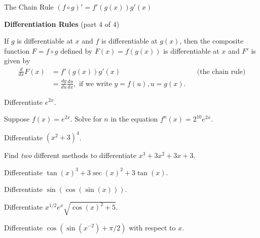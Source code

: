 \documentclass[../main.tex]{subfiles}
\begin{document}
\begin{lesson}{The Chain Rule \((f \circ g)' = f'(g(x))g'(x)\)}
  \begin{mdframed}[style=simple]
    \textbf{Differentiation Rules} \hfill {\footnotesize (part \(4\) of \(4\))}

    If \(g\) is differentiable at \(x\) and \(f\) is differentiable at \(g(x)\), then the composite function \(F = f \circ g\) defined by \(F(x) = f(g(x))\) is differentiable at \(x\) and \(F'\) is given by 
    \begin{align*}
      \frac{d}{dx} F(x) 
    &= f'(g(x)) g'(x)
    &&\text{(the chain rule)}\\[1em]
    &= \frac{dy}{du} \frac{du}{dx}, \text{ if we write } y = f(u), u = g(x).
    \end{align*}
  \end{mdframed}

  \begin{example}
    Differentiate \(e^{2x}\).
  \end{example}

  \begin{example}
    Suppose \(f(x) = e^{2x}\). Solve for \(n\) in the equation \(f^{n}(x) = 2^{10}e^{2x}\).
  \end{example}

  \begin{example}
    Differentiate \((x^{2}+3)^{4}\).
  \end{example}


  \begin{example}
    Find \emph{two} different methods to differentiate \(x^{3} + 3x^{2} + 3x + 3\).
  \end{example}


  \begin{example}
    Differentiate \(\tan(x)^{3} + 3 \sec(x)^{2} + 3\tan(x)\). 
  \end{example}


  \begin{example}
    Differentiate \(\sin(\cos(\sin(x)))\).
  \end{example}


  \begin{example}
    Differentiate \(x^{1/2} e^{x} \sqrt{\cos(x)^{2} + 5}\).
  \end{example}


  \begin{example}
    Differentiate \(\cos(\sin(x^{-2}) + \pi/2)\) with respect to \(x\).
  \end{example}
\end{lesson}
\end{document}
